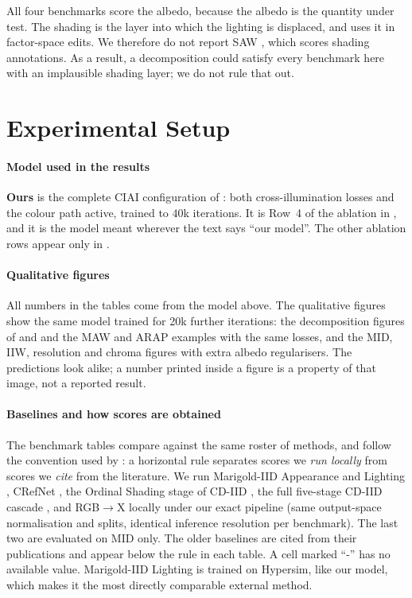 All four benchmarks score the albedo, because the albedo is the quantity under test. The
shading is the layer into which the lighting is displaced, and  uses it
in factor-space edits. We therefore do not report SAW , which scores
shading annotations. As a result, a decomposition could satisfy every benchmark here with
an implausible shading layer; we do not rule that out.


\section{Experimental Setup}
\label{sec:exp_setup}

\paragraph{Model used in the results}
\textbf{Ours} is the complete CIAI configuration of : both
cross-illumination losses and the colour path active, trained to $40$k iterations. It is
Row~4 of the ablation in , and it is the model meant wherever the text
says ``our model''. The other ablation rows appear only in .

\paragraph{Qualitative figures}
All numbers in the tables come from the model above. The qualitative figures show the same
model trained for 20k further iterations: the decomposition figures of 
and  and the MAW and ARAP examples with the same losses, and the MID,
IIW, resolution and chroma figures with extra albedo regularisers. The predictions
look alike; a number printed inside a figure is a property of that image, not a reported
result.

\paragraph{Baselines and how scores are obtained}
The benchmark tables compare against the same roster of methods, and follow the
convention used by : a horizontal rule separates scores
we \emph{run locally} from scores we \emph{cite} from the literature.
We run Marigold-IID Appearance and Lighting ,
CRefNet , the Ordinal Shading stage of CD-IID
, the full five-stage CD-IID cascade
, and RGB$\rightarrow$X  locally under our
exact pipeline (same output-space normalisation and splits, identical inference
resolution per benchmark). The last two are evaluated on MID only. The older baselines are
cited from their publications and appear below the rule in each table. A cell marked ``-''
has no available value.
Marigold-IID Lighting is trained on Hypersim, like our model, which makes it
the most directly comparable external method.

